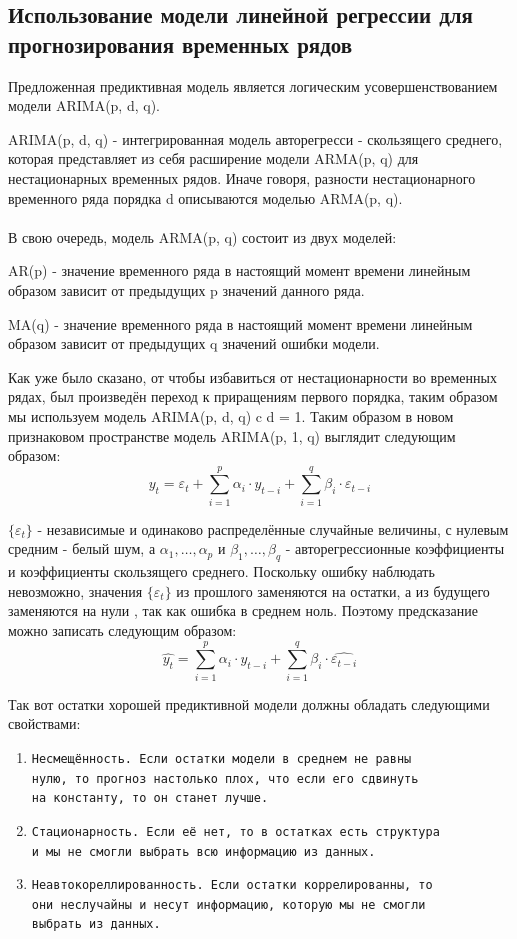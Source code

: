 \documentclass[14pt, a4paper]{extarticle}
\begin{document}
	\subsection{Использование модели линейной регрессии для прогнозирования временных рядов}	
	Предложенная предиктивная модель является логическим усовершенствованием модели  ARIMA(p, d, q).  
	
	ARIMA(p, d, q) - интегрированная модель авторегресси - скользящего среднего, которая  представляет из себя  расширение модели ARMA(p, q) для нестационарных временных рядов. Иначе говоря, разности нестационарного временного ряда порядка d описываются моделью ARMA(p, q). \\\\В свою очередь, модель ARMA(p, q) состоит из двух моделей:
	
	 AR(p) - значение временного ряда в настоящий момент времени линейным образом зависит от предыдущих p значений данного ряда.
	 
	  MA(q) - значение временного ряда в настоящий момент времени линейным образом зависит от предыдущих q значений ошибки модели.
	
	Как уже было сказано, от чтобы избавиться от нестационарности во временных рядах, был произведён переход к приращениям первого порядка, таким образом мы используем модель ARIMA(p, d, q) c d = 1. Таким образом в новом признаковом пространстве модель ARIMA(p, 1, q) выглядит следующим образом: \\
 $$y_t = \varepsilon_t+ \sum_{i=1}^{p}\alpha_i \cdot y_{t-i} + \sum_{i=1}^{q}\beta_i \cdot \varepsilon_{t-i}$$
 
$\{\varepsilon _{t}\}$ - независимые и одинаково распределённые случайные величины, с нулевым средним - белый шум, а $\alpha _{1},\dots ,\alpha _{p}$ и $\beta _{1},\ldots ,\beta _{q}$ - авторегрессионные коэффициенты и коэффициенты скользящего среднего. Поскольку ошибку наблюдать невозможно, значения $\{\varepsilon_t\}$ из прошлого  заменяются на остатки, а из будущего заменяются на нули , так как ошибка в среднем ноль. Поэтому предсказание можно записать следующим образом: 
$$\hat{y_t} = \sum_{i=1}^{p}\alpha_i \cdot y_{t-i} + \sum_{i=1}^{q}\beta_i \cdot \hat{\varepsilon_{t-i}}$$

Так вот остатки хорошей предиктивной модели должны обладать следующими свойствами:
 \begin{enumerate}
	 	\item \texttt{Несмещённость. Если остатки модели в среднем не равны \\нулю, то прогноз настолько плох, что если его сдвинуть \\на константу, то он станет лучше.}
	 	\item \texttt{Стационарность. Если её нет, то в остатках есть структура \\ и мы не смогли выбрать всю информацию из данных.}
	 	\item \texttt{Неавтокореллированность. Если остатки коррелированны, то \\они неслучайны и несут информацию, которую мы не смогли \\выбрать из данных.}
\end{enumerate}
\end{document}
